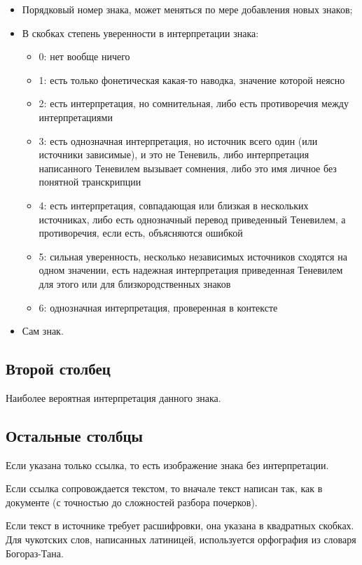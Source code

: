 \documentclass{article}
\begin{document}
\begin{itemize}
\item Порядковый номер знака, может меняться по мере добавления новых знаков; 
\item В скобках степень уверенности в интерпретации знака:
	\begin{itemize}
		\item 0:	нет вообще ничего
		\item 1: 	есть только фонетическая какая-то наводка, значение которой неясно
		\item 2:	есть интерпретация, но сомнительная, либо есть противоречия между интерпретациями
		\item 3:	есть однозначная интерпретация, но источник всего один (или источники зависимые), и это не Теневиль, либо интерпретация написанного Теневилем вызывает сомнения, либо это имя личное без понятной транскрипции
		\item 4:	есть интерпретация, совпадающая или близкая в нескольких источниках,  либо есть однозначный перевод приведенный Теневилем, а противоречия, если есть, объясняются ошибкой
		\item 5:	сильная уверенность, несколько независимых источников сходятся на одном значении, есть надежная интерпретация приведенная Теневилем для этого или для близкородственных знаков 
		\item 6:	однозначная интерпретация, проверенная в контексте %
	\end{itemize}
\item Сам знак.
\end{itemize}

\subsection{Второй столбец}
Наиболее вероятная интерпретация данного знака.

\subsection{Остальные столбцы}

Если указана только ссылка, то есть изображение знака без интерпретации.

Если ссылка сопровождается текстом, то вначале текст написан так, как в документе (с точностью до сложностей разбора почерков). 

Если текст в источнике требует расшифровки, она указана в квадратных скобках. Для чукотских слов, написанных латиницей, используется орфография из словаря Богораз-Тана\cite{bogoraz1937}.
\end{document}
